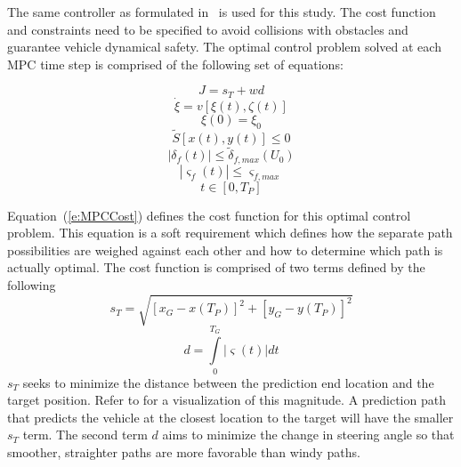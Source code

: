 \documentclass[12pt,twocolumn]{article}
\begin{document}
The same controller as formulated in~\cite{ModelFidelity2016} is used for this study. The cost function and constraints need to be specified to avoid collisions with obstacles and guarantee vehicle dynamical safety. The optimal control problem solved at each MPC time step is comprised of the following set of equations:

\begin{equation}\label{e:MPCCost}
J = s_T + wd 
\end{equation}
\begin{equation}\label{e:State_ODE}
\dot{\xi} = v\left[\xi\left(t\right),\zeta\left(t\right)\right] 
\end{equation}
\begin{equation}\label{e:InitialStates}
\xi\left(0\right) = \xi_0 
\end{equation}
\begin{equation}\label{e:SafeArea}
\tilde{S}\left[x\left(t\right),y\left(t\right)\right] \leq0  
\end{equation}
\begin{equation}\label{e:SteerLimit}
\left|\delta_f\left(t\right)\right| \leq\tilde{\delta}_{f,max}\left(U_0\right) 
\end{equation}
\begin{equation}\label{e:SteerRateLimit}
\left|\varsigma_f\left(t\right)\right| \leq\varsigma_{f,max} 
\end{equation}
\begin{equation}\label{e:TimeDomain}
t \in \left[0,T_P\right]
\end{equation}

Equation~(\ref{e:MPCCost}) defines the cost function for this optimal control problem. This equation is a soft requirement which defines how the separate path possibilities are weighed against each other and how to determine which path is actually optimal. The cost function is comprised of two terms defined by the following
%
\begin{equation}\label{e:DistanceCost}
s_T = \sqrt{\left[ x_G - x\left(T_P\right)\right]^2 + \left[y_G - y\left(T_P\right)\right]^2 }
\end{equation}
\begin{equation}\label{e:TurningCost}
d = \int \limits_0^{T_G} \left|\varsigma\left(t\right)\right| dt 
\end{equation}
%
$s_{T}$ seeks to minimize the distance between the prediction end location and the target position. Refer to  for a visualization of this magnitude. A prediction path that predicts the vehicle at the closest location to the target will have the smaller $s_{T}$ term. The second term $d$ aims to minimize the change in steering angle so that smoother, straighter paths are more favorable than windy paths.
\end{document}
